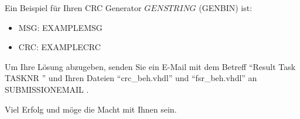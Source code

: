 \documentclass[a4paper,12pt]{article}
\begin{document}
Ein Beispiel f\"ur Ihren CRC Generator ${{GENSTRING}}$ ({{GENBIN}}) ist:
\begin{itemize}
    \item MSG: {{EXAMPLEMSG}}
    \item CRC: {{EXAMPLECRC}}
\end{itemize}

\vspace{0.3cm}
Um Ihre L\"osung abzugeben, senden Sie ein E-Mail mit dem Betreff "`Result Task {{ TASKNR }}"' und Ihren Dateien "`crc\_beh.vhdl"' und "`fsr\_beh.vhdl"'  an {{ SUBMISSIONEMAIL }}.
\vspace{0.7cm}

Viel Erfolg und m\"oge die Macht mit Ihnen sein.
\end{document}
